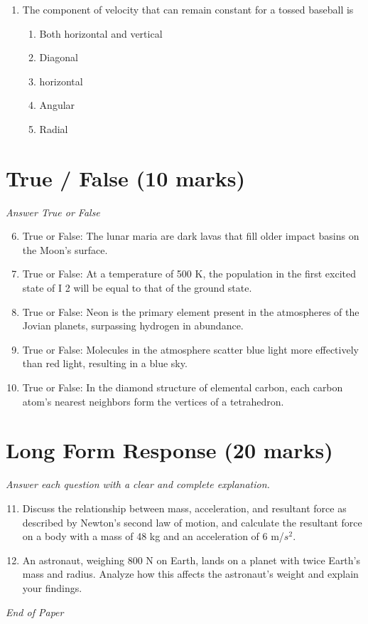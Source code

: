 \documentclass[12pt]{article}
\begin{document}
\begin{enumerate}[label=\arabic*.]
\begin{enumerate}[label=(\alph*)]
    \item - 0.45 m/sec
    \item - 0.38 m/sec
    \item - 0.60 m/sec
\end{enumerate}
\item The component of velocity that can remain constant for a tossed baseball is
\begin{enumerate}[label=(\alph*)]
    \item Both horizontal and vertical
    \item Diagonal
    \item horizontal
    \item Angular
    \item Radial
\end{enumerate}
\end{enumerate}

\section*{True / False (10 marks)}
\textit{Answer True or False}
\begin{enumerate}[label=\arabic*.]
\setcounter{enumi}{5}
\item True or False: The lunar maria are dark lavas that fill older impact basins on the Moon's surface.
\item True or False: At a temperature of 500 K, the population in the first excited state of I 2 will be equal to that of the ground state.
\item True or False: Neon is the primary element present in the atmospheres of the Jovian planets, surpassing hydrogen in abundance.
\item True or False: Molecules in the atmosphere scatter blue light more effectively than red light, resulting in a blue sky.
\item True or False: In the diamond structure of elemental carbon, each carbon atom's nearest neighbors form the vertices of a tetrahedron.
\end{enumerate}

\section*{Long Form Response (20 marks)}
\textit{Answer each question with a clear and complete explanation.}
\begin{enumerate}[label=\arabic*.]
\setcounter{enumi}{10}
\item Discuss the relationship between mass, acceleration, and resultant force as described by Newton's second law of motion, and calculate the resultant force on a body with a mass of 48 kg and an acceleration of 6 m/$s^2$.
\item An astronaut, weighing 800 N on Earth, lands on a planet with twice Earth's mass and radius. Analyze how this affects the astronaut's weight and explain your findings.
\end{enumerate}

\vfill
\noindent\textit{End of Paper}
\end{document}
